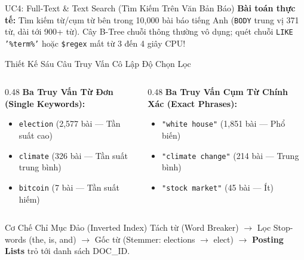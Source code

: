 \documentclass[aspectratio=169,9pt]{beamer}
\begin{document}
\begin{frame}{UC4: Full-Text \& Text Search (Tìm Kiếm Trên Văn Bản Báo)}
\textbf{Bài toán thực tế:} Tìm kiếm từ/cụm từ bên trong 10,000 bài báo tiếng Anh (\texttt{BODY} trung vị 371 từ, dài tới 900+ từ). Cây B-Tree chuỗi thông thường vô dụng; quét chuỗi \texttt{LIKE '\%term\%'} hoặc \texttt{\$regex} mất từ 3 đến 4 giây CPU!

\begin{block}{Thiết Kế Sáu Câu Truy Vấn Cô Lập Độ Chọn Lọc}
\footnotesize
\begin{columns}[T]
\begin{column}{0.48\textwidth}
\textbf{Ba Truy Vấn Từ Đơn (Single Keywords):}
\begin{itemize}
  \item \texttt{election} (2,577 bài --- Tần suất cao)
  \item \texttt{climate} (326 bài --- Tần suất trung bình)
  \item \texttt{bitcoin} (7 bài --- Tần suất hiếm)
\end{itemize}
\end{column}
\begin{column}{0.48\textwidth}
\textbf{Ba Truy Vấn Cụm Từ Chính Xác (Exact Phrases):}
\begin{itemize}
  \item \texttt{"white house"} (1,851 bài --- Phổ biến)
  \item \texttt{"climate change"} (214 bài --- Trung bình)
  \item \texttt{"stock market"} (45 bài --- Ít)
\end{itemize}
\end{column}
\end{columns}
\end{block}

\begin{exampleblock}{Cơ Chế Chỉ Mục Đảo (Inverted Index)}
\footnotesize
Tách từ (Word Breaker) $\to$ Lọc Stop-words (the, is, and) $\to$ Gốc từ (Stemmer: elections $\to$ elect) $\to$ \textbf{Posting Lists} trỏ tới danh sách DOC\_ID.
\end{exampleblock}
\end{frame}
\end{document}

